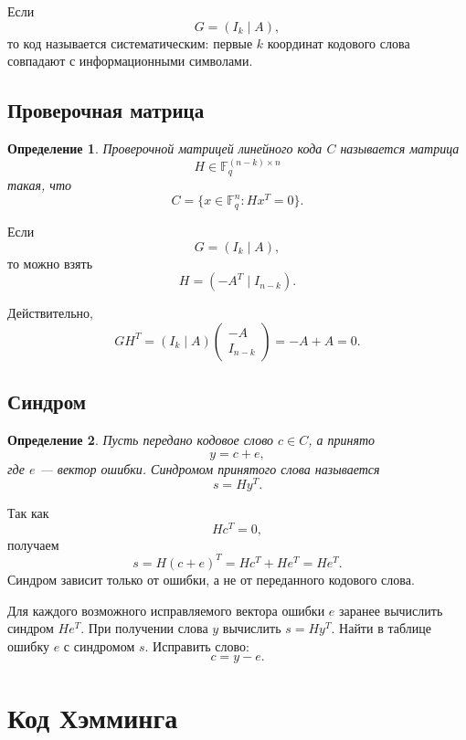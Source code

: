 \documentclass[12pt,a4paper]{article}
\newtheorem{definition}{Определение}[section]
\newcommand{\F}{\mathbb{F}}
\begin{document}
Если
\[
    G=(I_k\mid A),
\]
то код называется систематическим: первые $k$ координат кодового слова совпадают с информационными символами.

\subsection{Проверочная матрица}

\begin{definition}
Проверочной матрицей линейного кода $C$ называется матрица
\[
    H\in \F_q^{(n-k)\times n}
\]
такая, что
\[
    C=\{x\in \F_q^n:Hx^T=0\}.
\]
\end{definition}

Если
\[
    G=(I_k\mid A),
\]
то можно взять
\[
    H=(-A^T\mid I_{n-k}).
\]

Действительно,
\[
    GH^T=(I_k\mid A)
    \begin{pmatrix}
    -A\\
    I_{n-k}
    \end{pmatrix}
    =
    -A+A=0.
\]

\subsection{Синдром}

\begin{definition}
Пусть передано кодовое слово $c\in C$, а принято
\[
    y=c+e,
\]
где $e$ --- вектор ошибки.
Синдромом принятого слова называется
\[
    s=Hy^T.
\]
\end{definition}

Так как
\[
    Hc^T=0,
\]
получаем
\[
    s=H(c+e)^T=Hc^T+He^T=He^T.
\]
Синдром зависит только от ошибки, а не от переданного кодового слова.

\begin{algorithm}[H]
\caption{Декодирование по синдрому}
\begin{algorithmic}[1]
\STATE Для каждого возможного исправляемого вектора ошибки $e$ заранее вычислить синдром $He^T$.
\STATE При получении слова $y$ вычислить $s=Hy^T$.
\STATE Найти в таблице ошибку $e$ с синдромом $s$.
\STATE Исправить слово:
\[
    c=y-e.
\]
\end{algorithmic}
\end{algorithm}

\section{Код Хэмминга}
\end{document}
